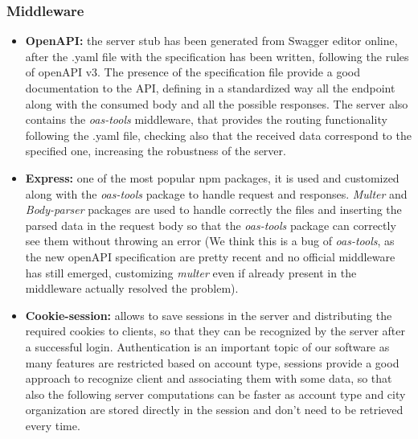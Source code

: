 \subsubsection{Middleware}
\begin{itemize}
	\item \textbf{OpenAPI:} the server stub has been generated from Swagger editor online, after the .yaml file with the specification has been written, following the rules of openAPI v3. The presence of the specification file provide a good documentation to the API, defining in a standardized way all the endpoint along with the consumed body and all the possible responses. The server also contains the \textit{oas-tools} middleware, that provides the routing functionality following the .yaml file, checking also that the received data correspond to the specified one, increasing the robustness of the server.
	
	\item \textbf{Express:} one of the most popular npm packages, it is used and customized along with the \textit{oas-tools} package to handle request and responses. \textit{Multer} and \textit{Body-parser} packages are used to handle correctly the files and inserting the parsed data in the request body so that the \textit{oas-tools} package can correctly see them without throwing an error (We think this is a bug of \textit{oas-tools}, as the new openAPI specification are pretty recent and no official middleware has still emerged, customizing \textit{multer} even if already present in the middleware actually resolved the problem).
	
	\item \textbf{Cookie-session:} allows to save sessions in the server and distributing the required cookies to clients, so that they can be recognized by the server after a successful login. Authentication is an important topic of our software as many features are restricted based on account type, sessions provide a good approach to recognize client and associating them with some data, so that also the following server computations can be faster as account type and city organization are stored directly in the session and don't need to be retrieved every time.
\end{itemize}


